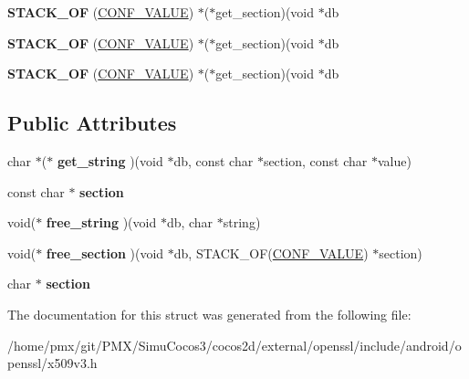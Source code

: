 \begin{DoxyCompactItemize}
{\bfseries S\+T\+A\+C\+K\+\_\+\+OF} (\hyperlink{structCONF__VALUE}{C\+O\+N\+F\+\_\+\+V\+A\+L\+UE}) $\ast$($\ast$get\+\_\+section)(void $\ast$db
\item 
\mbox{\label{structX509V3__CONF__METHOD__st_a77d6d5e2d94f1c44e4b19c3810de4f15}} 
{\bfseries S\+T\+A\+C\+K\+\_\+\+OF} (\hyperlink{structCONF__VALUE}{C\+O\+N\+F\+\_\+\+V\+A\+L\+UE}) $\ast$($\ast$get\+\_\+section)(void $\ast$db
\item 
\mbox{\label{structX509V3__CONF__METHOD__st_a77d6d5e2d94f1c44e4b19c3810de4f15}} 
{\bfseries S\+T\+A\+C\+K\+\_\+\+OF} (\hyperlink{structCONF__VALUE}{C\+O\+N\+F\+\_\+\+V\+A\+L\+UE}) $\ast$($\ast$get\+\_\+section)(void $\ast$db
\end{DoxyCompactItemize}
\subsection*{Public Attributes}
\begin{DoxyCompactItemize}
\item 
\mbox{\label{structX509V3__CONF__METHOD__st_ab0f8d7eb8fcd73469c18584e98fc9808}} 
char $\ast$($\ast$ {\bfseries get\+\_\+string} )(void $\ast$db, const char $\ast$section, const char $\ast$value)
\item 
\mbox{\label{structX509V3__CONF__METHOD__st_a955abef0aba6034bdf556fd55e9376f0}} 
const char $\ast$ {\bfseries section}
\item 
\mbox{\label{structX509V3__CONF__METHOD__st_a351213520dcfb566c120db99c26a416b}} 
void($\ast$ {\bfseries free\+\_\+string} )(void $\ast$db, char $\ast$string)
\item 
\mbox{\label{structX509V3__CONF__METHOD__st_a5efb773ce24dfbf490b42b4314b42f4f}} 
void($\ast$ {\bfseries free\+\_\+section} )(void $\ast$db, S\+T\+A\+C\+K\+\_\+\+OF(\hyperlink{structCONF__VALUE}{C\+O\+N\+F\+\_\+\+V\+A\+L\+UE}) $\ast$section)
\item 
\mbox{\label{structX509V3__CONF__METHOD__st_ac0685c3b398f0093e4d5c44c90259ac4}} 
char $\ast$ {\bfseries section}
\end{DoxyCompactItemize}


The documentation for this struct was generated from the following file\+:\begin{DoxyCompactItemize}
\item 
/home/pmx/git/\+P\+M\+X/\+Simu\+Cocos3/cocos2d/external/openssl/include/android/openssl/x509v3.\+h\end{DoxyCompactItemize}
